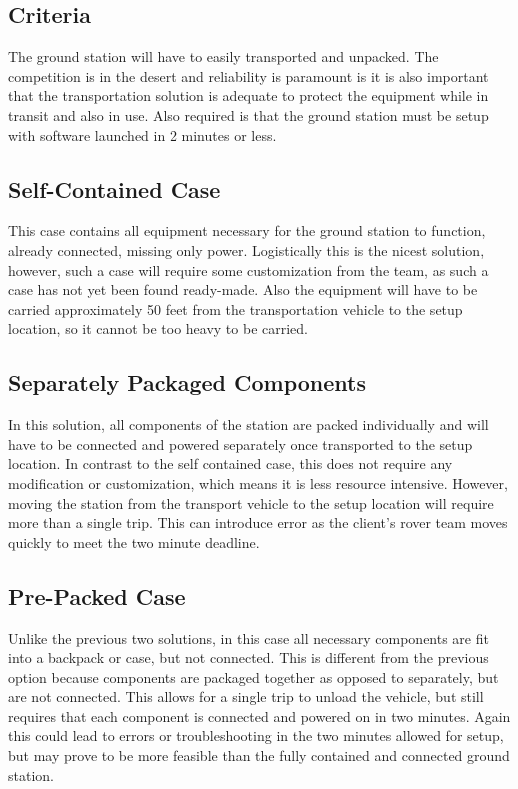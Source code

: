 \documentclass[onecolumn, draftclsnofoot, 10pt, compsoc]{IEEEtran}
\begin{document}
\subsection{Criteria}
The ground station will have to easily transported and unpacked.
The competition is in the desert and reliability is paramount is it is also important that the transportation solution is adequate to protect the equipment while in transit and also in use.
Also required is that the ground station must be setup with software launched in 2 minutes or less.

\subsection{Self-Contained Case}
This case contains all equipment necessary for the ground station to function, already connected, missing only power.
Logistically this is the nicest solution, however, such a case will require some customization from the team, as such a case has not yet been found ready-made.
Also the equipment will have to be carried approximately 50 feet from the transportation vehicle to the setup location, so it cannot be too heavy to be carried.

\subsection{Separately Packaged Components}
In this solution, all components of the station are packed individually and will have to be connected and powered separately once transported to the setup location.
In contrast to the self contained case, this does not require any modification or customization, which means it is less resource intensive.
However, moving the station from the transport vehicle to the setup location will require more than a single trip.
This can introduce error as the client's rover team moves quickly to meet the two minute deadline.

\subsection{Pre-Packed Case}
Unlike the previous two solutions, in this case all necessary components are fit into a backpack or case, but not connected.
This is different from the previous option because components are packaged together as opposed to separately, but are not connected.
This allows for a single trip to unload the vehicle, but still requires that each component is connected and powered on in two minutes.
Again this could lead to errors or troubleshooting in the two minutes allowed for setup, but may prove to be more feasible than the fully contained and connected ground station.
\end{document}
